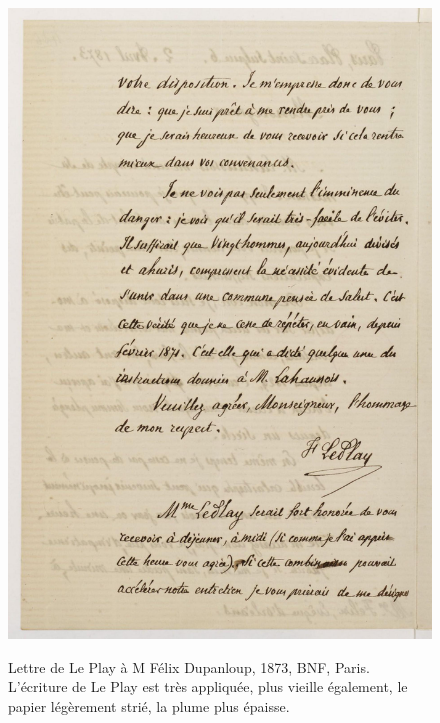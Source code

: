 \begin{figure}[H]
    \centering
    \caption{Lettre de Le Play à M Félix Dupanloup, 1873, BNF, Paris. L'écriture de Le Play est très appliquée, plus vieille également, le papier légèrement strié, la plume plus épaisse.}
    \includegraphics[width=15cm]{images/LPdupanloup2BNF9.jpg}
    \label{dupanloup}
\end{figure}
